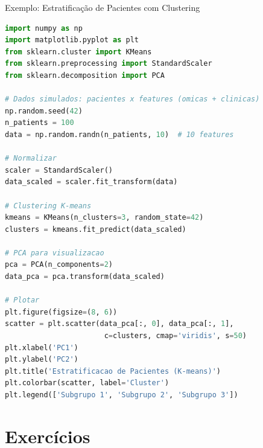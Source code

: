 \begin{frame}[fragile]{Exemplo: Estratificação de Pacientes com Clustering}
\begin{lstlisting}[language=Python, caption=Análise de clusters em dados clínicos, basicstyle=\ttfamily\footnotesize]
import numpy as np
import matplotlib.pyplot as plt
from sklearn.cluster import KMeans
from sklearn.preprocessing import StandardScaler
from sklearn.decomposition import PCA

# Dados simulados: pacientes x features (omicas + clinicas)
np.random.seed(42)
n_patients = 100
data = np.random.randn(n_patients, 10)  # 10 features

# Normalizar
scaler = StandardScaler()
data_scaled = scaler.fit_transform(data)

# Clustering K-means
kmeans = KMeans(n_clusters=3, random_state=42)
clusters = kmeans.fit_predict(data_scaled)

# PCA para visualizacao
pca = PCA(n_components=2)
data_pca = pca.transform(data_scaled)

# Plotar
plt.figure(figsize=(8, 6))
scatter = plt.scatter(data_pca[:, 0], data_pca[:, 1],
                       c=clusters, cmap='viridis', s=50)
plt.xlabel('PC1')
plt.ylabel('PC2')
plt.title('Estratificacao de Pacientes (K-means)')
plt.colorbar(scatter, label='Cluster')
plt.legend(['Subgrupo 1', 'Subgrupo 2', 'Subgrupo 3'])
\end{lstlisting}
\end{frame}

\section{Exercícios}

